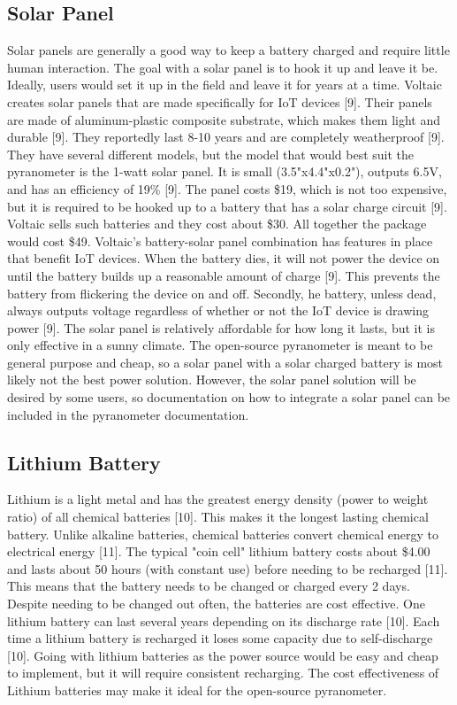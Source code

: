 \documentclass[10pt,draftclsnofoot,onecolumn,letterpaper]{article}
\begin{document}
\subsection{Solar Panel}
Solar panels are generally a good way to keep a battery charged and require little human interaction. The goal with a solar panel is to hook it up and leave it be. Ideally, users would set it up in the field and leave it for years at a time. Voltaic creates solar panels that are made specifically for IoT devices [9]. Their panels are made of aluminum-plastic composite substrate, which makes them light and durable [9]. They reportedly last 8-10 years and are completely weatherproof [9]. They have several different models, but the model that would best suit the pyranometer is the 1-watt solar panel. It is small (3.5"x4.4"x0.2"), outputs 6.5V, and has an efficiency of 19\% [9]. The panel costs \$19, which is not too expensive, but it is required to be hooked up to a battery that has a solar charge circuit [9]. Voltaic sells such batteries and they cost about \$30. All together the package would cost \$49. Voltaic's battery-solar panel combination has features in place that benefit IoT devices. When the battery dies, it will not power the device on until the battery builds up a reasonable amount of charge [9]. This prevents the battery from flickering the device on and off. Secondly, he battery, unless dead, always outputs voltage regardless of whether or not the IoT device is drawing power [9]. The solar panel is relatively affordable for how long it lasts, but it is only effective in a sunny climate. The open-source pyranometer is meant to be general purpose and cheap, so a solar panel with a solar charged battery is most likely not the best power solution. However, the solar panel solution will be desired by some users, so documentation on how to integrate a solar panel can be included in the pyranometer documentation.

\subsection{Lithium Battery}
Lithium is a light metal and has the greatest energy density (power to weight ratio) of all chemical batteries [10]. This makes it the longest lasting chemical battery. Unlike alkaline batteries, chemical batteries convert chemical energy to electrical energy [11]. The typical "coin cell" lithium battery costs about \$4.00 and lasts about 50 hours (with constant use) before needing to be recharged [11]. This means that the battery needs to be changed or charged every 2 days. Despite needing to be changed out often, the batteries are cost effective. One lithium battery can last several years depending on its discharge rate [10]. Each time a lithium battery is recharged it loses some capacity due to self-discharge [10]. Going with lithium batteries as the power source would be easy and cheap to implement, but it will require consistent recharging. The cost effectiveness of Lithium batteries may make it ideal for the open-source pyranometer.
\end{document}
